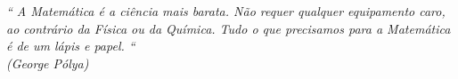 \begin{epigrafe}
    \vspace*{\fill}
    \hspace{.35\textwidth}
    {\begin{minipage}{.6\textwidth}
    	\begin{flushright}
            \textit{``
                A Matemática é a ciência mais barata. Não requer qualquer equipamento caro, ao contrário da Física ou da Química. Tudo o que precisamos para a Matemática é de um lápis e papel.
                ``\\
                (George Pólya)}
        \end{flushright}
    \end{minipage}}%

\end{epigrafe}
